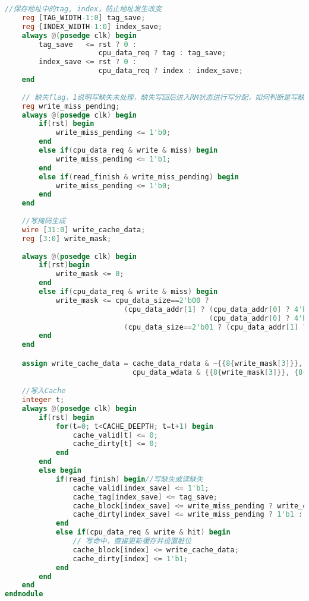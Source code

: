 \begin{lstlisting}[language=Verilog,frame=single]
    //保存地址中的tag, index，防止地址发生改变
    reg [TAG_WIDTH-1:0] tag_save;
    reg [INDEX_WIDTH-1:0] index_save;
    always @(posedge clk) begin
        tag_save   <= rst ? 0 :
                      cpu_data_req ? tag : tag_save;
        index_save <= rst ? 0 :
                      cpu_data_req ? index : index_save;
    end
    
    // 缺失flag，1说明写缺失未处理，缺失写回后进入RM状态进行写分配，如何判断是写缺失还是读缺失
    reg write_miss_pending;
    always @(posedge clk) begin
        if(rst) begin
            write_miss_pending <= 1'b0;
        end
        else if(cpu_data_req & write & miss) begin
            write_miss_pending <= 1'b1;
        end
        else if(read_finish & write_miss_pending) begin
            write_miss_pending <= 1'b0;
        end
    end
    
    //写掩码生成
    wire [31:0] write_cache_data;
    reg [3:0] write_mask;
    
    always @(posedge clk) begin
        if(rst)begin
            write_mask <= 0;
        end
        else if(cpu_data_req & write & miss) begin
            write_mask <= cpu_data_size==2'b00 ?
                            (cpu_data_addr[1] ? (cpu_data_addr[0] ? 4'b1000 : 4'b0100):
                                                (cpu_data_addr[0] ? 4'b0010 : 4'b0001)) :
                            (cpu_data_size==2'b01 ? (cpu_data_addr[1] ? 4'b1100 : 4'b0011) : 4'b1111);
        end
    end 

    assign write_cache_data = cache_data_rdata & ~{{8{write_mask[3]}}, {8{write_mask[2]}}, {8{write_mask[1]}}, {8{write_mask[0]}}} | 
                              cpu_data_wdata & {{8{write_mask[3]}}, {8{write_mask[2]}}, {8{write_mask[1]}}, {8{write_mask[0]}}};

    //写入Cache
    integer t;
    always @(posedge clk) begin
        if(rst) begin
            for(t=0; t<CACHE_DEEPTH; t=t+1) begin
                cache_valid[t] <= 0;
                cache_dirty[t] <= 0;
            end
        end
        else begin
            if(read_finish) begin//写缺失或读缺失
                cache_valid[index_save] <= 1'b1;
                cache_tag[index_save] <= tag_save;
                cache_block[index_save] <= write_miss_pending ? write_cache_data : cache_data_rdata;//写缺失用CPU要写的数据覆写内存读取出的数据并写入到Cache中，读缺失则直接用内存读取出的数据写入到Cache中
                cache_dirty[index_save] <= write_miss_pending ? 1'b1 : 1'b0;
            end
            else if(cpu_data_req & write & hit) begin
                // 写命中，直接更新缓存并设置脏位
                cache_block[index] <= write_cache_data;
                cache_dirty[index] <= 1'b1;
            end
        end
    end
endmodule
\end{lstlisting}